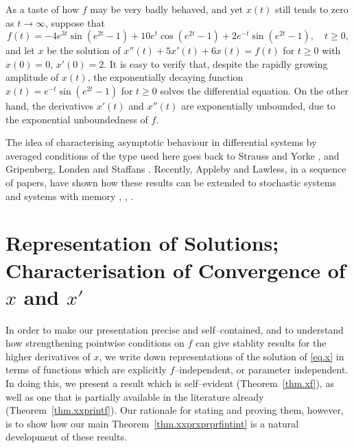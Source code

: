 \documentclass[10pt,reqno]{amsart}
\theoremstyle{definition}
\begin{document}
	As a taste of how $f$ may be very badly behaved, and yet $x(t)$ still tends to zero as $t\to\infty$, suppose that 
	\[
	f(t)=-4e^{3t}\sin(e^{2t}-1)+10e^t \cos(e^{2t}-1)+2e^{-t}\sin(e^{2t}-1), \quad t\geq 0,
	\] 
	and let $x$ be the solution of $x''(t)+5x'(t)+6x(t)=f(t)$ for $t\geq 0$ with $x(0)=0$, $x'(0)=2$. It is easy to verify that, despite the rapidly growing amplitude of $x(t)$, the exponentially decaying function  $x(t)=e^{-t}\sin(e^{2t}-1)$ for $t\geq 0$ solves the differential equation. On the other hand, the derivatives $x'(t)$ and $x''(t)$ are exponentially unbounded, due to the exponential unboundedness of $f$.   
	
	The idea of characterising asymptotic behaviour in differential systems by averaged conditions of the type used here goes back to 
	Strauss and Yorke \cite{SY67b,SY67a}, and Gripenberg, Londen and Staffans \cite{GLS}. Recently, Appleby and Lawless, in a sequence of papers, have shown how these results can be extended to stochastic systems and systems with memory \cite{AL:2023(AppliedMathLetters)} \cite{AL:2023(AppliedNumMath)}, \cite{AL:2024}, \cite{AL:panto24}.
	
	\section{Representation of Solutions; Characterisation of Convergence of $x$ and $x'$}
	In order to make our presentation precise and self--contained, and to understand how strengthening pointwise conditions on $f$ can give stablity results for the higher derivatives of $x$, we write down representations of the solution of \eqref{eq.x} in terms of functions which are explicitly $f$--independent, or parameter independent. In doing this, we present a result which is self--evident (Theorem~\ref{thm.xf}), as well as one that is partially available in the literature already (Theorem~\ref{thm.xxprintf}). Our rationale for stating and proving them, however, is to show how our main Theorem~\ref{thm.xxprxprprfintint} is a natural development of these results. 
	
\end{document}
